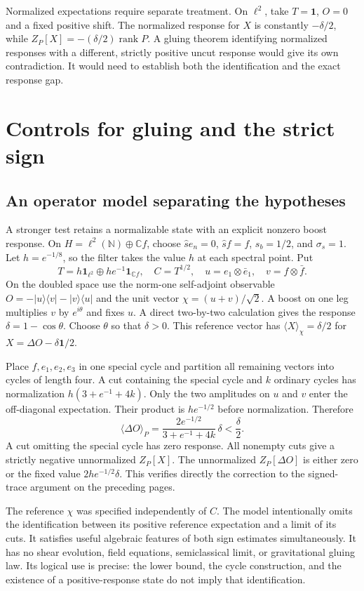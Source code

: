 \documentclass[11pt]{article}
\newcommand{\id}{\mathbf{1}}
\newcommand{\areaop}{\hat s}
\DeclareMathOperator{\rank}{rank}
\newcommand{\parttitle}[2]{\clearpage\section{#1}\markboth{#2}{#2}}
\begin{document}
Normalized expectations require separate treatment. On $\ell^2$, take $T=\id$, $O=0$ and a fixed positive shift. The normalized response for $X$ is constantly $-\delta/2$, while $Z_P[X]=-(\delta/2)\rank P$. A gluing theorem identifying normalized responses with a different, strictly positive uncut response would give its own contradiction. It would need to establish both the identification and the exact response gap.

\parttitle{Controls for gluing and the strict sign}{Controls for gluing}
\subsection{An operator model separating the hypotheses}
A stronger test retains a normalizable state with an explicit nonzero boost response. On $H=\ell^2(\mathbb N)\oplus\mathbb C f$, choose $\areaop e_n=0$, $\areaop f=f$, $s_b=1/2$, and $\sigma_s=1$. Let $h=e^{-1/8}$, so the filter takes the value $h$ at each spectral point. Put
\[
 T=h\id_{\ell^2}\oplus he^{-1}\id_{\mathbb Cf},\quad C=T^{1/2},
 \quad u=e_1\otimes\bar e_1,\quad v=f\otimes\bar f .
\]
On the doubled space use the norm-one self-adjoint observable $O=-|u\rangle\langle v|-|v\rangle\langle u|$ and the unit vector $\chi=(u+v)/\sqrt{2}$. A boost on one leg multiplies $v$ by $e^{i\theta}$ and fixes $u$. A direct two-by-two calculation gives the response $\delta=1-\cos\theta$. Choose $\theta$ so that $\delta>0$. This reference vector has $\langle X\rangle_\chi=\delta/2$ for $X=\Delta O-\delta\id/2$.

Place $f,e_1,e_2,e_3$ in one special cycle and partition all remaining vectors into cycles of length four. A cut containing the special cycle and $k$ ordinary cycles has normalization $h(3+e^{-1}+4k)$. Only the two amplitudes on $u$ and $v$ enter the off-diagonal expectation. Their product is $he^{-1/2}$ before normalization. Therefore
\[
 \langle\Delta O\rangle_P
 =\frac{2e^{-1/2}}{3+e^{-1}+4k}\,\delta<\frac{\delta}{2}.
\]
A cut omitting the special cycle has zero response. All nonempty cuts give a strictly negative unnormalized $Z_P[X]$. The unnormalized $Z_P[\Delta O]$ is either zero or the fixed value $2he^{-1/2}\delta$. This verifies directly the correction to the signed-trace argument on the preceding pages.

The reference $\chi$ was specified independently of $C$. The model intentionally omits the identification between its positive reference expectation and a limit of its cuts. It satisfies useful algebraic features of both sign estimates simultaneously. It has no shear evolution, field equations, semiclassical limit, or gravitational gluing law. Its logical use is precise: the lower bound, the cycle construction, and the existence of a positive-response state do not imply that identification.
\end{document}
